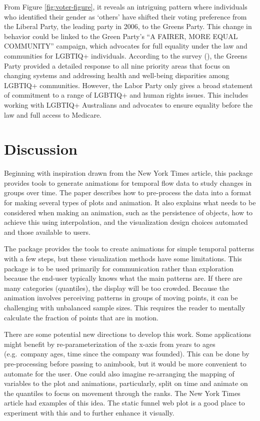From Figure \ref{fig:voter-figure}, it reveals an intriguing pattern where individuals who identified their gender as `others' have shifted their voting preference from the Liberal Party, the leading party in 2006, to the Greens Party. This change in behavior could be linked to the Green Party's ``A FAIRER, MORE EQUAL COMMUNITY'' campaign, which advocates for full equality under the law and communities for LGBTIQ+ individuals. According to the survey (\citet{lgbtiq}), the Greens Party provided a detailed response to all nine priority areas that focus on changing systems and addressing health and well-being disparities among LGBTIQ+ communities. However, the Labor Party only gives a broad statement of commitment to a range of LGBTIQ+ and human rights issues. This includes working with LGBTIQ+ Australians and advocates to ensure equality before the law and full access to Medicare.

\section{Discussion}\label{discussion}

Beginning with inspiration drawn from the New York Times article, this package provides tools to generate animations for temporal flow data to study changes in groups over time. The paper describes how to pre-process the data into a format for making several types of plots and animation. It also explains what needs to be considered when making an animation, such as the persistence of objects, how to achieve this using interpolation, and the visualization design choices automated and those available to users.

The package provides the tools to create animations for simple temporal patterns with a few steps, but these visualization methods have some limitations. This package is to be used primarily for communication rather than exploration because the end-user typically knows what the main patterns are. If there are many categories (quantiles), the display will be too crowded. Because the animation involves perceiving patterns in groups of moving points, it can be challenging with unbalanced sample sizes. This requires the reader to mentally calculate the fraction of points that are in motion.

There are some potential new directions to develop this work. Some applications might benefit by re-parameterization of the x-axis from years to ages (e.g.~company ages, time since the company was founded). This can be done by pre-processing before passing to animbook, but it would be more convenient to automate for the user. One could also imagine re-arranging the mapping of variables to the plot and animations, particularly, split on time and animate on the quantiles to focus on movement through the ranks. The New York Times article had examples of this idea. The static funnel web plot is a good place to experiment with this and to further enhance it visually.

